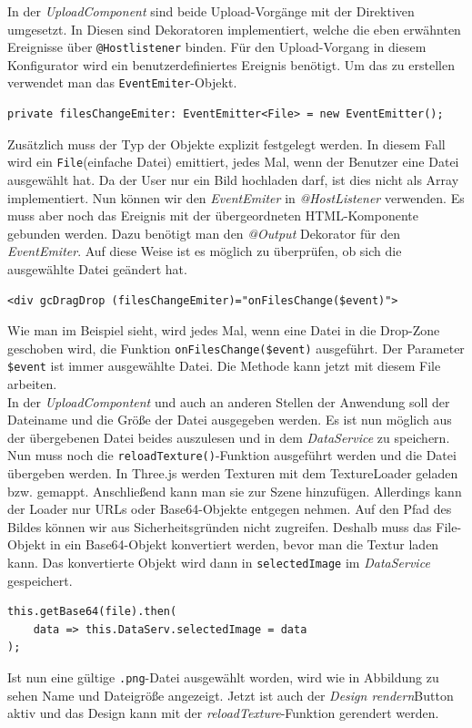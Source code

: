 In der \textit{UploadComponent} sind beide Upload-Vorgänge mit der Direktiven umgesetzt. In Diesen sind Dekoratoren implementiert, welche die eben erwähnten  Ereignisse über \texttt{@Hostlistener} binden. Für den Upload-Vorgang in diesem Konfigurator wird ein benutzerdefiniertes Ereignis benötigt. Um das zu erstellen verwendet man das \texttt{EventEmiter}-Objekt.
%
\begin{lstlisting}
private filesChangeEmiter: EventEmitter<File> = new EventEmitter();
\end{lstlisting}
%
Zusätzlich muss der Typ der Objekte explizit festgelegt werden. In diesem Fall wird ein \texttt{File}(einfache Datei) emittiert, jedes Mal, wenn der Benutzer eine Datei ausgewählt hat. Da der User nur ein Bild hochladen darf, ist dies nicht als Array implementiert. Nun können wir den \textit{EventEmiter} in \textit{@HostListener} verwenden. Es muss aber noch das Ereignis mit der übergeordneten HTML-Komponente gebunden werden. Dazu benötigt man den \textit{@Output} Dekorator für den \textit{EventEmiter}. Auf diese Weise ist es möglich zu überprüfen, ob sich die ausgewählte Datei geändert hat.
%
\begin{lstlisting}
<div gcDragDrop (filesChangeEmiter)="onFilesChange($event)">
\end{lstlisting}
%
Wie man im Beispiel sieht, wird jedes Mal, wenn eine Datei in die Drop-Zone geschoben wird, die Funktion \texttt{onFilesChange(\$event)} ausgeführt. Der Parameter \texttt{\$event} ist immer ausgewählte Datei. Die Methode kann jetzt mit diesem File arbeiten.\\

In der \textit{UploadCompontent} und auch an anderen Stellen der Anwendung soll der Dateiname und die Größe der Datei ausgegeben werden. Es ist nun möglich aus der übergebenen Datei beides auszulesen und in dem \textit{DataService} zu speichern. Nun muss noch die \texttt{reloadTexture()}-Funktion ausgeführt werden und die Datei übergeben werden. In Three.js werden Texturen mit dem TextureLoader geladen bzw. gemappt. Anschließend kann man sie zur Szene hinzufügen. Allerdings kann der Loader nur URLs oder Base64-Objekte entgegen nehmen. Auf den Pfad des Bildes können wir aus Sicherheitsgründen nicht zugreifen. Deshalb muss das File-Objekt in ein Base64-Objekt konvertiert werden, bevor man die Textur laden kann. Das konvertierte Objekt wird dann in \texttt{selectedImage} im \textit{DataService} gespeichert.
%
\begin{lstlisting}
this.getBase64(file).then(
	data => this.DataServ.selectedImage = data
);
\end{lstlisting}
%
Ist nun eine gültige \texttt{.png}-Datei ausgewählt worden, wird wie in Abbildung zu sehen Name und Dateigröße angezeigt. Jetzt ist auch der \textit{Design rendern}Button aktiv und das Design kann mit der \textit{reloadTexture}-Funktion gerendert werden.

